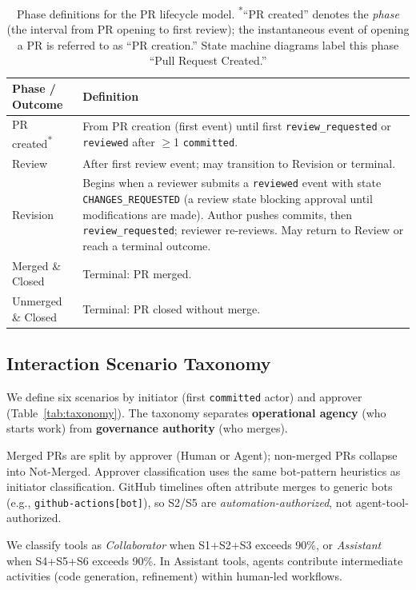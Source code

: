 \documentclass[sigconf]{acmart}
\begin{document}
\begin{table}[t]
\caption{Phase definitions for the PR lifecycle model.
\textsuperscript{*}``PR created'' denotes the \emph{phase}
(the interval from PR opening to first review); the instantaneous
event of opening a PR is referred to as ``PR creation.''
State machine diagrams label this phase ``Pull Request Created.''}
\label{tab:phase-def}
\centering
\small
\begin{tabularx}{\linewidth}{@{}l>{\raggedright\arraybackslash}X@{}}
\toprule
\textbf{Phase / Outcome} & \textbf{Definition} \\
\midrule
PR created\textsuperscript{*} & From PR creation (first event) until first \texttt{review\_requested} or \texttt{reviewed} after $\geq$1 \texttt{committed}. \\
Review & After first review event; may transition to Revision or terminal. \\
Revision & Begins when a reviewer submits a \texttt{reviewed} event with state \texttt{CHANGES\_REQUESTED} (a review state blocking approval until modifications are made). Author pushes commits, then \texttt{review\_requested}; reviewer re-reviews. May return to Review or reach a terminal outcome. \\
Merged \& Closed & Terminal: PR merged. \\
Unmerged \& Closed & Terminal: PR closed without merge. \\
\bottomrule
\end{tabularx}
\end{table}

\subsection{Interaction Scenario Taxonomy}

We define six scenarios by initiator (first \texttt{committed}
actor) and approver (Table~\ref{tab:taxonomy}).
The taxonomy separates \textbf{operational agency} (who starts
work) from \textbf{governance authority} (who merges).

Merged PRs are split by approver (Human or Agent); non-merged PRs
collapse into Not-Merged.
Approver classification uses the same bot-pattern heuristics as
initiator classification.
GitHub timelines often attribute merges to generic bots
(e.g., \texttt{github-actions[bot]}), so S2/S5 are
\emph{automation-authorized}, not agent-tool-authorized.

We classify tools as \emph{Collaborator} when S1+S2+S3 exceeds
90\%, or \emph{Assistant} when S4+S5+S6 exceeds 90\%.
In Assistant tools, agents contribute intermediate activities
(code generation, refinement) within human-led workflows.
\end{document}
